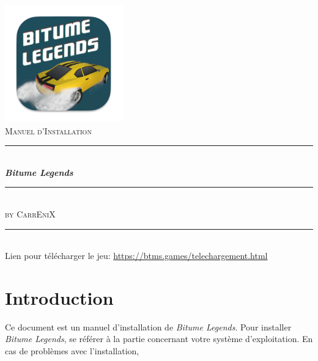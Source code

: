 \documentclass[a4paper,12pt]{article}
\newcommand{\HRule}{\rule{\linewidth}{0.5mm}}
\newcommand{\btmlgs}{\textsl{Bitume Legends}}
\newcommand{\CEX}{\textsc{CarrEniX}}
\newcommand{\report}{Manuel d'Installation}
\begin{document}
  

    \begin{titlepage}
        \begin{center}
            \includegraphics[scale=0.7]{logo192.png}\\[0.5cm]
            \textsc{\Large \report}\\[1.5cm]

            \HRule \\[0.4cm]
            { \LARGE \bfseries \btmlgs \\[0.4cm] }

            \HRule \\[2cm]
        
            \textsc{by \Large \CEX}\\[1.5cm]
        \end{center}
        \tableofcontents
        \begin{center}
            \HRule\\
            Lien pour télécharger le jeu: \url{https://btms.games/telechargement.html}
        \end{center}
    \end{titlepage}

    \section*{Introduction}
        Ce document est un manuel d'installation de \btmlgs.
        Pour installer \btmlgs, se référer à la partie concernant votre système d'exploitation.
        En cas de problèmes avec l'installation, 
\end{document}
